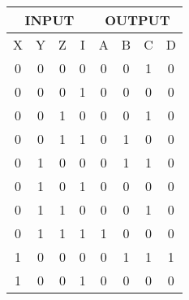 \begin{tabular}{|c|c|c|c|c|c|c|c|}
\hline \multicolumn{4}{|c|}{INPUT} & \multicolumn{4}{|c|}{OUTPUT} \\
\hline X & Y & Z & I & A & B & C & D \\
\hline 0 & 0 & 0 & 0 & 0 & 0 & 1 & 0 \\
\hline 0 & 0 & 0 & 1 & 0 & 0 & 0 & 0 \\
\hline 0 & 0 & 1 & 0 & 0 & 0 & 1 & 0 \\
\hline 0 & 0 & 1 & 1 & 0 & 1 & 0 & 0 \\
\hline 0 & 1 & 0 & 0 & 0 & 1 & 1 & 0 \\
\hline 0 & 1 & 0 & 1 & 0 & 0 & 0 & 0 \\
\hline 0 & 1 & 1 & 0 & 0 & 0 & 1 & 0 \\
\hline 0 & 1 & 1 & 1 & 1 & 0 & 0 & 0 \\
\hline 1 & 0 & 0 & 0 & 0 & 1 & 1 & 1 \\
\hline 1 & 0 & 0 & 1 & 0 & 0 & 0 & 0 \\
\hline 
\end{tabular}

